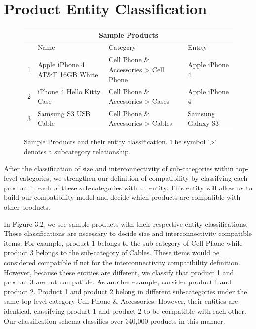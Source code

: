 \section{Product Entity Classification}
\begin{figure}[h!]
    \begin{tabular}{ |p{0.5cm}|p{5cm}|p{4cm}|p{3cm}| }
     \hline
     \multicolumn{4}{|c|}{Sample Products} \\
     \hline
      & Name & Category & Entity \\
     \hline
     1 & Apple iPhone 4 AT\&T 16GB White & Cell Phone \& Accessories > Cell Phone  & Apple iPhone 4 \\
     2 & iPhone 4 Hello Kitty Case & Cell Phone \& Accessories > Cases & Apple iPhone 4 \\
     3 & Samsung S3 USB Cable & Cell Phone \& Accessories > Cables & Samsung Galaxy S3 \\
     \hline
    \end{tabular}
    \caption{Sample Products and their entity classification. The symbol '>' denotes a subcategory relationship.}
\end{figure}

After the classification of size and interconnectivity of sub-categories within top-level categories, we strengthen our definition of compatibility by classifying each product in each of these sub-categories with an entity. This entity will allow us to build our compatibility model and decide which products are compatible with other products. 

In Figure 3.2, we see sample products with their respective entity classifications. These classifications are necessary to decide size and interconnectivity compatible items. For example, product 1 belongs to the sub-category of Cell Phone while product 3 belongs to the sub-category of Cables. These items would be considered compatible if not for the interconnectivity compatibility definition. However, because these entities are different, we classify that product 1 and product 3 are not compatible. As another example, consider product 1 and product 2. Product 1 and product 2 belong in different sub-categories under the same top-level category Cell Phone \& Accessories. However, their entities are identical, classifying product 1 and product 2 to be compatible with each other. Our classification schema classifies over 340,000 products in this manner.


